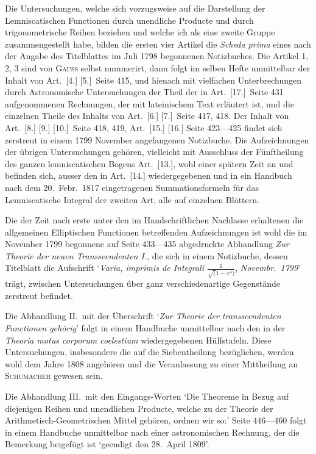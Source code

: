 \documentclass[12pt,a4paper]{article}
\begin{document}
\newpage

Die Untersuchungen, welche sich vorzugsweise auf die Darstellung der Lemniscatischen Functionen durch unendliche Producte und durch trigonometrische Reihen beziehen und welche ich als eine zweite
Gruppe zusammengestellt habe, bilden die ersten vier Artikel die \textit{Scheda prima} eines nach der Angabe
des Titelblattes im Juli 1798 begonnenen Notizbuches. Die Artikel 1, 2, 3 sind von \textsc{Gau\ss} selbst nummerirt, dann folgt im selben Hefte unmittelbar der Inhalt von Art.~[4.] [5.]\ Seite 415, und hienach mit
vielfachen Unterbrechungen durch Astronomische Untersuchungen der Theil der in Art.~[17.]\ Seite 431 aufgenommenen Rechnungen, der mit lateinischem Text erl\"autert ist, und die einzelnen Theile des Inhalts
von Art.~[6.] [7.]\ Seite 417, 418. Der Inhalt von Art.~[8.] [9.] [10.]\ Seite 418, 419, Art.~[15.] [16.]
Seite 423---425 findet sich zerstreut in einem 1799 November angefangenen Notizbuche. Die Aufzeichnungen der \"ubrigen Untersuchungen geh\"oren, vielleicht mit Ausschluss der F\"unftheilung des ganzen lemniscatischen Bogens Art.~[13.], wohl einer sp\"atern Zeit an und befinden sich, ausser den in Art.~[14.] wiedergegebenen und in ein Handbuch nach dem 20.\ Febr.\ 1817 eingetragenen Summationsformeln f\"ur das Lemniscatische Integral der zweiten Art, alle auf einzelnen Bl\"attern.

Die der Zeit nach erste unter den im Handschriftlichen Nachlasse erhaltenen die allgemeinen Elliptischen Functionen betreffenden Aufzeichnungen ist wohl die im November 1799 begonnene auf Seite
433---435 abgedruckte Abhandlung \textit{Zur Theorie der neuen Transscendenten I.}, die sich in einem Notizbuche, dessen Titelblatt die Aufschrift `\textit{Varia, imprimis de Integrali} $\frac{1}{\surd(1-x^4)}$, \textit{Novembr.\ 1799}' tr\"agt, zwischen Untersuchungen \"uber ganz verschiedenartige Gegenst\"ande zerstreut befindet.

Die Abhandlung II.\ mit der \"Uberschrift `\textit{Zur Theorie der transscendenten Functionen geh\"orig}' folgt
in einem Handbuche unmittelbar nach den in der \textit{Theoria motus corporum coelestium} wiedergegebenen
H\"ulfstafeln. Diese Untersuchungen, insbesondere die auf die Siebentheilung bez\"uglichen, werden wohl
dem Jahre 1808 angeh\"oren und die Veranlassung zu einer Mittheilung an \textsc{Schumacher} gewesen sein.

Die Abhandlung III.\ mit den Eingangs-Worten `Die Theoreme in Bezug auf diejenigen Reihen und unendlichen Producte, welche zu der Theorie der Arithmetisch-Geometrischen Mittel geh\"oren, ordnen wir so:' Seite 446---460 folgt in einem Handbuche unmittelbar nach einer astronomischen Rechnung, der die Bemerkung beigef\"ugt ist `geendigt den 28.\ April 1809'.
\end{document}

